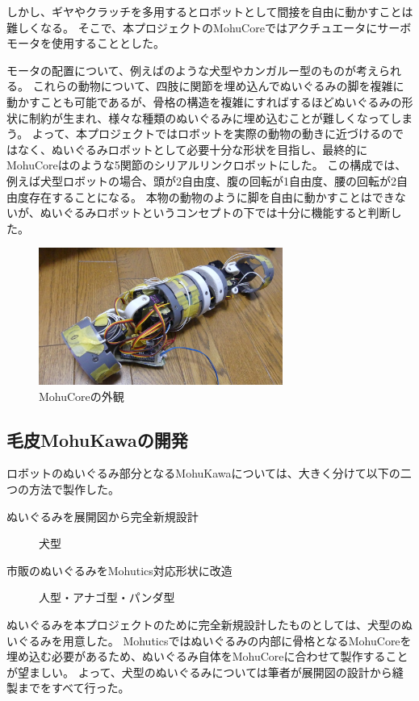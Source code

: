 \documentclass[uplatex,a4paper,12pt]{jsarticle}
\begin{document}
しかし、ギヤやクラッチを多用するとロボットとして間接を自由に動かすことは難しくなる。
そこで、本プロジェクトのMohuCoreではアクチュエータにサーボモータを使用することとした。

モータの配置について、例えばのような犬型やカンガルー型のものが考えられる。
これらの動物について、四肢に関節を埋め込んでぬいぐるみの脚を複雑に動かすことも可能であるが、骨格の構造を複雑にすればするほどぬいぐるみの形状に制約が生まれ、様々な種類のぬいぐるみに埋め込むことが難しくなってしまう。
よって、本プロジェクトではロボットを実際の動物の動きに近づけるのではなく、ぬいぐるみロボットとして必要十分な形状を目指し、最終的にMohuCoreはのような5関節のシリアルリンクロボットにした。
この構成では、例えば犬型ロボットの場合、頭が2自由度、腹の回転が1自由度、腰の回転が2自由度存在することになる。
本物の動物のように脚を自由に動かすことはできないが、ぬいぐるみロボットというコンセプトの下では十分に機能すると判断した。


\begin{figure}[htbp]
  \centering
  \includegraphics[width=8cm]{images/mohucore/skeleton.jpg}
  \caption{MohuCoreの外観}
  \label{fig::mohucore:skeleton}
\end{figure}

\subsection{毛皮MohuKawaの開発}

ロボットのぬいぐるみ部分となるMohuKawaについては、大きく分けて以下の二つの方法で製作した。
\begin{description}
  \item[ぬいぐるみを展開図から完全新規設計]犬型
  \item[市販のぬいぐるみをMohutics対応形状に改造]人型・アナゴ型・パンダ型  
\end{description}

ぬいぐるみを本プロジェクトのために完全新規設計したものとしては、犬型のぬいぐるみを用意した。
Mohuticsではぬいぐるみの内部に骨格となるMohuCoreを埋め込む必要があるため、ぬいぐるみ自体をMohuCoreに合わせて製作することが望ましい。
よって、犬型のぬいぐるみについては筆者が展開図の設計から縫製までをすべて行った。
\end{document}
